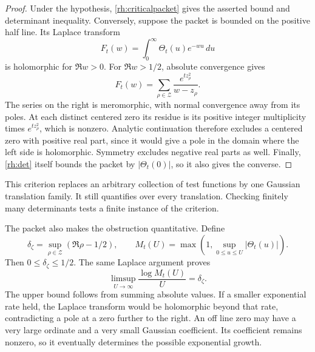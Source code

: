 \begin{proof}
Under the hypothesis, \eqref{rh:criticalpacket} gives the asserted bound and determinant inequality. Conversely, suppose the packet is bounded on the positive half line. Its Laplace transform
\[
F_t(w)=\int_0^{\infty}\Theta_t(u)e^{-wu}\,du
\]
is holomorphic for \(\Re w>0\). For \(\Re w>1/2\), absolute convergence gives
\begin{equation}\label{rh:laplace}
F_t(w)=\sum_{\rho\in\mathcal Z}
\frac{e^{tz_\rho^2}}{w-z_\rho}.
\end{equation}
The series on the right is meromorphic, with normal convergence away from its poles. At each distinct centered zero its residue is its positive integer multiplicity times \(e^{tz_\rho^2}\), which is nonzero. Analytic continuation therefore excludes a centered zero with positive real part, since it would give a pole in the domain where the left side is holomorphic. Symmetry excludes negative real parts as well. Finally, \eqref{rh:det} itself bounds the packet by \(|\Theta_t(0)|\), so it also gives the converse.
\end{proof}

This criterion replaces an arbitrary collection of test functions by one Gaussian translation family. It still quantifies over every translation. Checking finitely many determinants tests a finite instance of the criterion.

The packet also makes the obstruction quantitative. Define
\begin{equation}\label{rh:delta}
\delta_\zeta=\sup_{\rho\in\mathcal Z}(\Re\rho-1/2),
\qquad
M_t(U)=\max\left(1,\sup_{0\le u\le U}|\Theta_t(u)|\right).
\end{equation}
Then \(0\le\delta_\zeta\le1/2\). The same Laplace argument proves
\begin{equation}\label{rh:front}
\limsup_{U\to\infty}\frac{\log M_t(U)}{U}=\delta_\zeta.
\end{equation}
The upper bound follows from summing absolute values. If a smaller exponential rate held, the Laplace transform would be holomorphic beyond that rate, contradicting a pole at a zero further to the right. An off line zero may have a very large ordinate and a very small Gaussian coefficient. Its coefficient remains nonzero, so it eventually determines the possible exponential growth.


